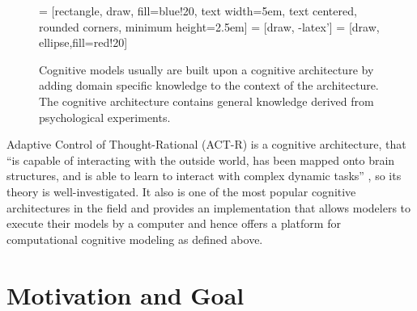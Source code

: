 \begin{figure}[hbt]
\centering
 = [rectangle, draw, fill=blue!20, 
    text width=5em, text centered, rounded corners, minimum height=2.5em]
 = [draw, -latex']
 = [draw, ellipse,fill=red!20]
    
\caption{Cognitive models usually are built upon a cognitive architecture by adding domain specific knowledge to the context of the architecture. The cognitive architecture contains general knowledge derived from psychological experiments. \cite{about_actr_homepage}}
\label{fig:cognitive_models_architecture}
\end{figure}

Adaptive Control of Thought-Rational  (ACT-R) is a cognitive architecture, that ``is capable of interacting with the outside world, has been mapped onto brain structures, and is able to learn to interact with complex dynamic tasks'' \cite[29]{taatgen_modeling_2006}, so its theory is well-investigated. It also is one of the most popular cognitive architectures in the field \cite{rutledge2005can} and provides an implementation that allows modelers to execute their models by a computer and hence offers a platform for computational cognitive modeling as defined above.

\section{Motivation and Goal}

